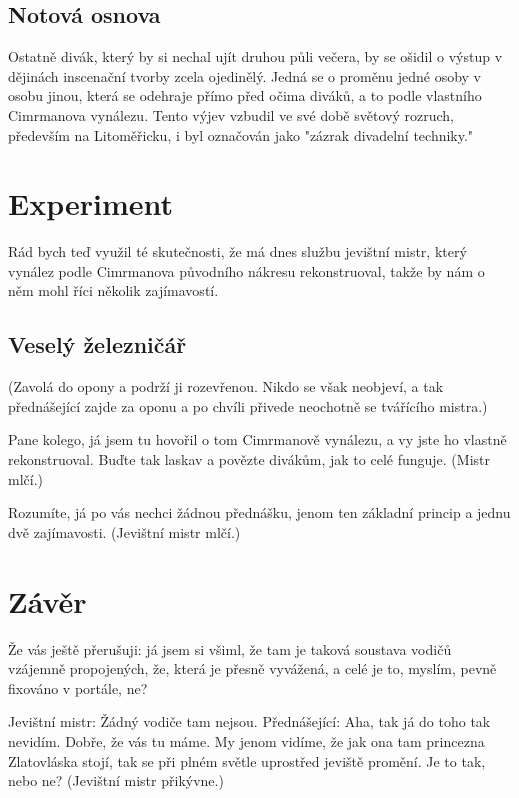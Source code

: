 \documentclass{cygclanek}
\begin{document}
\subsection{Notová osnova}
Ostatně divák, který by si nechal ujít druhou půli večera, by se ošidil o výstup v dějinách inscenační tvorby zcela ojedinělý. Jedná se o proměnu jedné osoby v osobu jinou, která se odehraje přímo před očima diváků, a to podle vlastního Cimrmanova vynálezu. Tento výjev vzbudil ve své době světový rozruch, především na Litoměřicku, i byl označován jako "zázrak divadelní techniky."


\section{Experiment}
Rád bych teď využil té skutečnosti, že má dnes službu jevištní mistr, který vynález podle Cimrmanova původního nákresu rekonstruoval, takže by nám o něm mohl říci několik zajímavostí. 

\subsection{Veselý železničář}
(Zavolá do opony a podrží ji rozevřenou. Nikdo se však neobjeví, a tak přednášející zajde za oponu a po chvíli přivede neochotně se tvářícího mistra.)

Pane kolego, já jsem tu hovořil o tom Cimrmanově vynálezu, a vy jste ho vlastně rekonstruoval. Buďte tak laskav a povězte divákům, jak to celé funguje. (Mistr mlčí.)

Rozumíte, já po vás nechci žádnou přednášku, jenom ten základní princip a jednu dvě zajímavosti. (Jevištní mistr mlčí.)
\section{Závěr}
Že vás ještě přerušuji: já jsem si všiml, že tam je taková soustava vodičů vzájemně propojených, že, která je přesně vyvážená, a celé je to, myslím, pevně fixováno v portále, ne?

Jevištní mistr: Žádný vodiče tam nejsou. Přednášející: Aha, tak já do toho tak nevidím. Dobře, že vás tu máme. My jenom vidíme, že jak ona tam princezna Zlatovláska stojí, tak se při plném světle uprostřed jeviště promění. Je to tak, nebo ne? (Jevištní mistr přikývne.)
\end{document}
